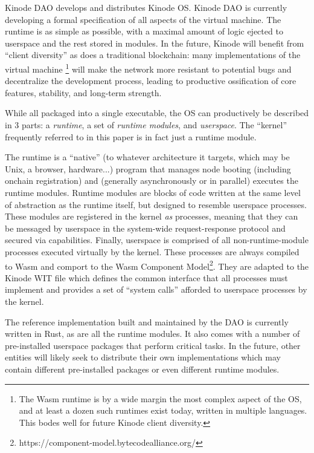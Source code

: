 \documentclass[runningheads]{llncs}
\begin{document}
Kinode DAO develops and distributes Kinode OS.
Kinode DAO is currently developing a formal specification of all aspects of the virtual machine.
The runtime is as simple as possible, with a maximal amount of logic ejected to userspace and the rest stored in modules.
In the future, Kinode will benefit from ``client diversity'' as does a traditional blockchain: many implementations of the virtual machine
\footnote{The Wasm runtime is by a wide margin the most complex aspect of the OS, and at least a dozen such runtimes exist today, written in multiple languages.
This bodes well for future Kinode client diversity.}
will make the network more resistant to potential bugs and decentralize the development process, leading to productive ossification of core features, stability, and long-term strength.

While all packaged into a single executable, the OS can productively be described in 3 parts: a \textit{runtime}, a set of \textit{runtime modules}, and \textit{userspace}.
The ``kernel'' frequently referred to in this paper is in fact just a runtime module.

The runtime is a ``native'' (to whatever architecture it targets, which may be Unix, a browser, hardware...) program that manages node booting (including onchain registration) and (generally asynchronously or in parallel) executes the runtime modules.
Runtime modules are blocks of code written at the same level of abstraction as the runtime itself, but designed to resemble userspace processes.
These modules are registered in the kernel \textit{as} processes, meaning that they can be messaged by userspace in the system-wide request-response protocol and secured via capabilities.
Finally, userspace is comprised of all non-runtime-module processes executed virtually by the kernel.
These processes are always compiled to Wasm and comport to the Wasm Component Model\footnote{https://component-model.bytecodealliance.org/}.
They are adapted to the Kinode WIT file which defines the common interface that all processes must implement and provides a set of ``system calls'' afforded to userspace processes by the kernel.

The reference implementation built and maintained by the DAO is currently written in Rust, as are all the runtime modules.
It also comes with a number of pre-installed userspace packages that perform critical tasks.
In the future, other entities will likely seek to distribute their own implementations which may contain different pre-installed packages or even different runtime modules.
\end{document}

